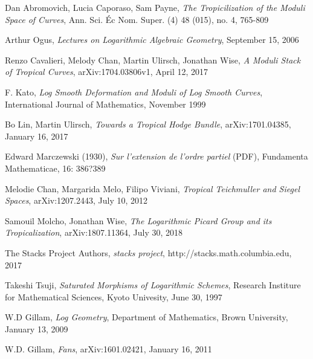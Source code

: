 \documentclass[12pt]{amsart}
\numberwithin{equation}{section}
\theoremstyle{plain}
\theoremstyle{remark}
\begin{document}
		
\begin{thebibliography}{9}

 Dan Abromovich, Lucia Caporaso, Sam Payne, \emph{The Tropicilization of the Moduli Space of Curves}, Ann. Sci. \'Ec Nom. Super. (4) 48 (015), no. 4, 765-809

 Arthur Ogus, \emph{Lectures on Logarithmic Algebraic Geometry}, September 15, 2006

 Renzo Cavalieri, Melody Chan, Martin Ulirsch, Jonathan Wise,\emph{ A Moduli Stack of Tropical Curves}, arXiv:1704.03806v1, April 12, 2017

 F. Kato, \emph{Log Smooth Deformation and Moduli of Log Smooth Curves}, International Journal of Mathematics, November 1999

 Bo Lin, Martin Ulirsch, \emph{Towards a Tropical Hodge Bundle}, arXiv:1701.04385, January 16, 2017

 Edward Marczewski (1930), \emph{Sur l'extension de l'ordre partiel} (PDF), Fundamenta Mathematicae, 16: 386?389

 Melodie Chan, Margarida Melo, Filipo Viviani, \emph{Tropical Teichmuller and Siegel Spaces}, arXiv:1207.2443, July 10, 2012

 Samouil Molcho, Jonathan Wise, \emph{The Logarithmic Picard Group and its Tropicalization}, arXiv:1807.11364, July 30, 2018

 The Stacks Project Authors, \emph{stacks project}, http://stacks.math.columbia.edu, 2017

 Takeshi Tsuji, \emph{Saturated Morphisms of Logarithmic Schemes}, Research Institure for Mathematical Sciences, Kyoto Univesity, June 30, 1997

 W.D Gillam, \emph{Log Geometry}, Department of Mathematics, Brown University, January 13, 2009

 W.D. Gillam, \emph{Fans}, arXiv:1601.02421, January 16, 2011

\end{thebibliography}
\end{document}
